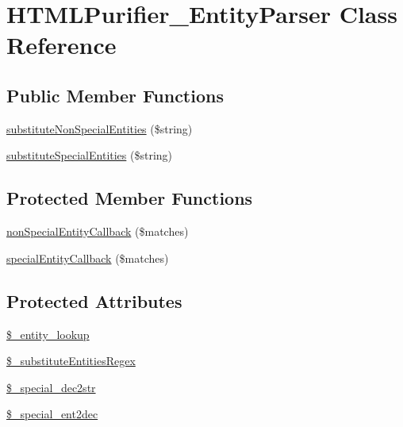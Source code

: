 \hypertarget{classHTMLPurifier__EntityParser}{\section{H\+T\+M\+L\+Purifier\+\_\+\+Entity\+Parser Class Reference}
\label{classHTMLPurifier__EntityParser}
}
\subsection*{Public Member Functions}
\begin{DoxyCompactItemize}
\item 
\hyperlink{classHTMLPurifier__EntityParser_a1e003bfd746dfbda9dcc27b0a543cdfb}{substitute\+Non\+Special\+Entities} (\$string)
\item 
\hyperlink{classHTMLPurifier__EntityParser_af5763f9df0bcd1b2972c43bcf3876658}{substitute\+Special\+Entities} (\$string)
\end{DoxyCompactItemize}
\subsection*{Protected Member Functions}
\begin{DoxyCompactItemize}
\item 
\hyperlink{classHTMLPurifier__EntityParser_a787c07173c94c9f1070d0d86f73e87a2}{non\+Special\+Entity\+Callback} (\$matches)
\item 
\hyperlink{classHTMLPurifier__EntityParser_a32b6c60a636f6d7619a9e334c57830d8}{special\+Entity\+Callback} (\$matches)
\end{DoxyCompactItemize}
\subsection*{Protected Attributes}
\begin{DoxyCompactItemize}
\item 
\hyperlink{classHTMLPurifier__EntityParser_a4c4b9d2b462fea1c7d027f009dabf4aa}{\$\+\_\+entity\+\_\+lookup}
\item 
\hyperlink{classHTMLPurifier__EntityParser_a0d3d84748792da4caba3150a0a9daaf9}{\$\+\_\+substitute\+Entities\+Regex}
\item 
\hyperlink{classHTMLPurifier__EntityParser_a0144a916f272789e64e2bd514139b31e}{\$\+\_\+special\+\_\+dec2str}
\item 
\hyperlink{classHTMLPurifier__EntityParser_a1233260b0aaf087445e962aca4d12689}{\$\+\_\+special\+\_\+ent2dec}
\end{DoxyCompactItemize}


